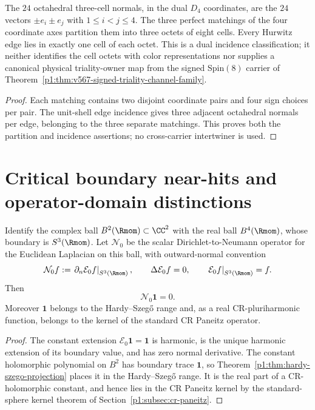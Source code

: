 \documentclass[11pt]{article}
\begin{document}
\begin{corollary}
\label{p1:cor:v235-dual-cell-triality}
The \(24\) octahedral three-cell normals, in the dual
\(D_4\) coordinates, are the \(24\) vectors
\(\pm e_i\pm e_j\) with \(1\le i<j\le4\).
The three perfect matchings of the four coordinate axes partition
them into three octets of eight cells.  Every Hurwitz edge lies in
exactly one cell of each octet.  This is a dual incidence
classification; it neither identifies the cell octets with color
representations nor supplies a canonical physical triality-owner map
from the signed Spin\((8)\) carrier of
Theorem~\ref{p1:thm:v567-signed-triality-channel-family}.
\end{corollary}
\begin{proof}
Each matching contains two disjoint coordinate pairs and four
sign choices per pair.  The unit-shell edge incidence gives three
adjacent octahedral normals per edge, belonging to the three
separate matchings.  This proves both the partition and incidence
assertions; no cross-carrier intertwiner is used.
\end{proof}

\section{Critical boundary near-hits and operator-domain distinctions}
\label{p1:sec:v167-critical-boundary-near-hits}

\begin{theorem}
\label{p1:thm:v167-hardy-constant-dtn-zero}
Identify the complex ball \(B^2(\Rmom)\subset\CC^2\) with the real ball
\(B^4(\Rmom)\), whose boundary is \(S^3(\Rmom)\).  Let
\(\mathcal N_0\) be the scalar Dirichlet-to-Neumann operator for the Euclidean
Laplacian on this ball, with outward-normal convention
\[
 \mathcal N_0f:=\left.\partial_n\mathcal E_0f\right|_{S^3(\Rmom)},
 \qquad
 \Delta\mathcal E_0f=0,
 \qquad
 \left.\mathcal E_0f\right|_{S^3(\Rmom)}=f.
\]
Then
\[
 \boxed{\mathcal N_0\mathbf1=0.}
\]
Moreover \(\mathbf1\) belongs to the Hardy--Szeg\H{o} range and, as a real
CR-pluriharmonic function, belongs to the kernel of the standard CR Paneitz
operator.
\end{theorem}

\begin{proof}
The constant extension \(\mathcal E_0\mathbf1=\mathbf1\) is harmonic, is the
unique harmonic extension of its boundary value, and has zero normal
derivative.  The constant holomorphic polynomial on \(B^2\) has boundary
trace \(\mathbf1\), so Theorem~\ref{p1:thm:hardy-szego-projection} places it
in the Hardy--Szeg\H{o} range.  It is the real part of a CR-holomorphic
constant, and hence lies in the CR Paneitz kernel by the standard-sphere
kernel theorem of Section~\ref{p1:subsec:cr-paneitz}.
\end{proof}
\end{document}
